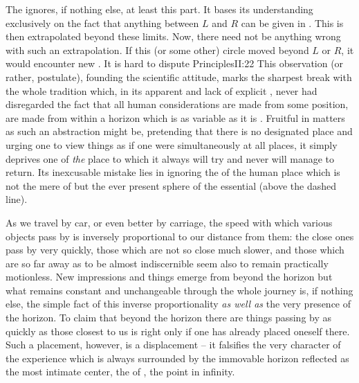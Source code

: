 \pa %
The  ignores, if nothing else, at least this part.
It bases its understanding exclusively on the fact that anything between $L$ and
$R$ can be given in .  This is then extrapolated beyond
these limits.  Now, there need not be anything wrong with such an extrapolation.
If this (or some other) circle moved beyond $L$ or $R$, it would encounter new
. It is hard to dispute \citet{that the matter of the heaven
  does not differ from that of the earth; and that even if there were countless
  worlds in all it would be impossible for them not to all be of one and the
  same matter.}{Principles}{II:22} This observation (or rather, postulate),
founding the scientific attitude, marks the sharpest break with the whole
tradition which, in its apparent  and lack of explicit
, never had disregarded the fact that all human considerations are
made from some  position, are made from within a horizon which is as
variable as it is . Fruitful in  matters as such
an abstraction might be, pretending that there is no designated place and urging
one to view things as if one were simultaneously at all places, it simply
deprives one of {\em the} place to which it always will try and never will
manage to return.  Its inexcusable mistake lies in ignoring the
 of the human place which is not the mere  of
 but the ever present sphere of the essential 
(above the dashed line).  

As we travel by car, or even better by carriage, the speed with which various
objects pass by is inversely proportional to our distance from them: the close
ones pass by very quickly, those which are not so close much slower, and those
which are so far away as to be almost indiscernible seem also to remain 
practically motionless. New impressions and things emerge from beyond the
horizon but what remains constant and unchangeable through the whole journey is,
if nothing else, the simple fact of this inverse proportionality {\em
  as well as} the very presence of the horizon. To claim that beyond the horizon
there are things passing by as quickly as those closest to us is right only if
one has already placed oneself there. Such a placement, however, is a
displacement -- it falsifies the very character of the experience which is always
surrounded by the immovable horizon reflected as the most intimate center, the
 of , the point in infinity. 

